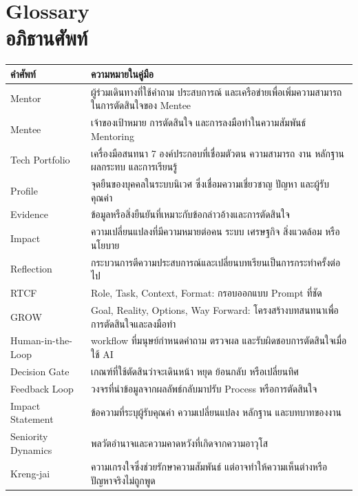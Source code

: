 \chapter{Glossary\\อภิธานศัพท์}

\begin{longtable}{P{.25\textwidth}P{.62\textwidth}}
\toprule
\textbf{คำศัพท์} & \textbf{ความหมายในคู่มือ}\\
\midrule
Mentor & ผู้ร่วมเดินทางที่ใช้คำถาม ประสบการณ์ และเครือข่ายเพื่อเพิ่มความสามารถในการตัดสินใจของ Mentee\\
Mentee & เจ้าของเป้าหมาย การตัดสินใจ และการลงมือทำในความสัมพันธ์ Mentoring\\
Tech Portfolio & เครื่องมือสนทนา 7 องค์ประกอบที่เชื่อมตัวตน ความสามารถ งาน หลักฐาน ผลกระทบ และการเรียนรู้\\
Profile & จุดยืนของบุคคลในระบบนิเวศ ซึ่งเชื่อมความเชี่ยวชาญ ปัญหา และผู้รับคุณค่า\\
Evidence & ข้อมูลหรือสิ่งยืนยันที่เหมาะกับข้อกล่าวอ้างและการตัดสินใจ\\
Impact & ความเปลี่ยนแปลงที่มีความหมายต่อคน ระบบ เศรษฐกิจ สิ่งแวดล้อม หรือนโยบาย\\
Reflection & กระบวนการตีความประสบการณ์และเปลี่ยนบทเรียนเป็นการกระทำครั้งต่อไป\\
RTCF & Role, Task, Context, Format: กรอบออกแบบ Prompt ที่ชัด\\
GROW & Goal, Reality, Options, Way Forward: โครงสร้างบทสนทนาเพื่อการตัดสินใจและลงมือทำ\\
Human-in-the-Loop & workflow ที่มนุษย์กำหนดคำถาม ตรวจผล และรับผิดชอบการตัดสินใจเมื่อใช้ AI\\
Decision Gate & เกณฑ์ที่ใช้ตัดสินว่าจะเดินหน้า หยุด ย้อนกลับ หรือเปลี่ยนทิศ\\
Feedback Loop & วงจรที่นำข้อมูลจากผลลัพธ์กลับมาปรับ Process หรือการตัดสินใจ\\
Impact Statement & ข้อความที่ระบุผู้รับคุณค่า ความเปลี่ยนแปลง หลักฐาน และบทบาทของงาน\\
Seniority Dynamics & พลวัตอำนาจและความคาดหวังที่เกิดจากความอาวุโส\\
Kreng-jai & ความเกรงใจซึ่งช่วยรักษาความสัมพันธ์ แต่อาจทำให้ความเห็นต่างหรือปัญหาจริงไม่ถูกพูด\\
\bottomrule
\end{longtable}
